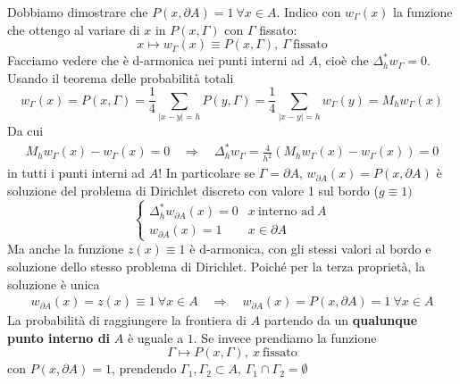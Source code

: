 \documentclass[10pt,a4paper,twoside,openright]{book}
\begin{document}
Dobbiamo dimostrare che $\displaystyle P(x,\partial A) =1\ \forall x\in A$. Indico con $\displaystyle w_{\Gamma }(x)$ la funzione che ottengo al variare di $\displaystyle x$ in $\displaystyle P(x,\Gamma)$ con $\displaystyle \Gamma $ fissato:
\begin{equation*}
	x\longmapsto w_{\Gamma }(x) \equiv P(x,\Gamma),\ \Gamma \ \text{fissato}
\end{equation*}
Facciamo vedere che è d-armonica nei punti interni ad $\displaystyle A$, cioè che $\displaystyle \Delta ^{*}_{h} w_{\Gamma } =0$. Usando il teorema delle probabilità totali
\begin{equation*}
	w_{\Gamma }(x) =P(x,\Gamma) =\frac{1}{4}\sum _{| x-y| =h} P(y,\Gamma) =\frac{1}{4}\sum _{| x-y| =h} w_{\Gamma }(y) =M_{h} w_{\Gamma }(x)
\end{equation*}
Da cui
\begin{gather*}
	M_{h} w_{\Gamma }(x) -w_{\Gamma }(x) =0 \quad \Rightarrow \quad \Delta ^{*}_{h} w_{\Gamma } =\frac{4}{h^{2}}( M_{h} w_{\Gamma }(x) -w_{\Gamma }(x)) =0
\end{gather*}
in tutti i punti interni ad $A$! In particolare se $\Gamma =\partial A$, $w_{\partial A}(x) =P(x,\partial A)$ è soluzione del problema di Dirichlet discreto con valore 1 sul bordo ($g\equiv 1)$
\begin{equation*}
	\begin{cases}
		\Delta ^{*}_{h} w_{\partial A}(x) =0 & x\ \text{interno ad} \ A \\
		w_{\partial A}(x) =1              & x\in \partial A          
	\end{cases}
\end{equation*}
Ma anche la funzione $z(x) \equiv 1$ è d-armonica, con gli stessi valori al bordo e soluzione dello stesso problema di Dirichlet. Poiché per la terza proprietà, la soluzione è unica 
\begin{gather*}
	w_{\partial A}(x) =z(x) \equiv 1\ \forall x\in A \quad \Rightarrow \quad w_{\partial A}(x) =P(x,\partial A) =1\ \forall x\in A
\end{gather*}
La probabilità di raggiungere la frontiera di $A$ partendo da un \textbf{qualunque punto interno di} $A$ è uguale a $1$. Se invece prendiamo la funzione
\begin{equation*}
	\Gamma \longmapsto P(x,\Gamma),\ x\ \text{fissato}
\end{equation*}
con $\displaystyle P(x,\partial A) =1$, prendendo $\displaystyle \Gamma _{1},\Gamma _{2} \subset A$, $\displaystyle \Gamma _{1} \cap \Gamma _{2} =\emptyset $
\end{document}
